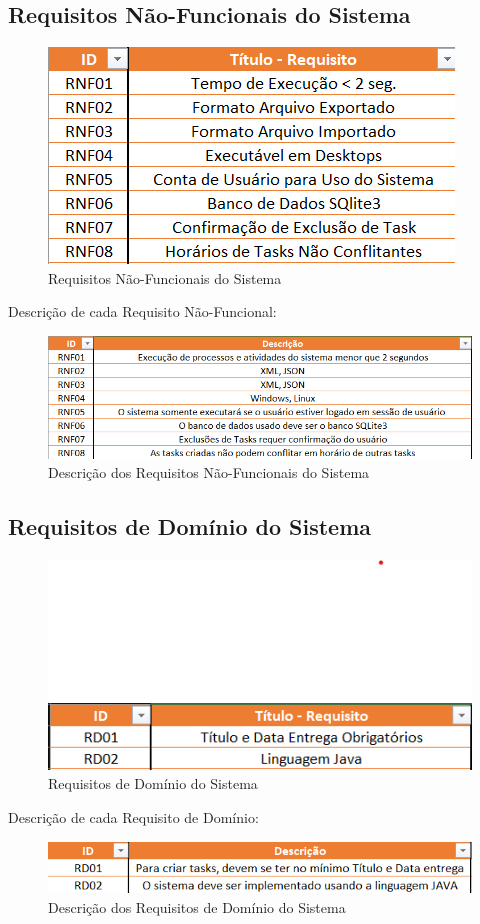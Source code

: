 \documentclass[a4paper,12pt]{article}
\begin{document}
\subsection{Requisitos Não-Funcionais do Sistema}
\begin{figure}[H]
	\centering
	\includegraphics[scale=0.80]{requirements/not-functionals/not-functionals.png}
	\caption{Requisitos Não-Funcionais do Sistema}
\end{figure}
Descrição de cada Requisito Não-Funcional:
\begin{figure}[H]
	\centering
	\includegraphics[scale=0.80]{requirements/not-functionals/description.png}
	\caption{Descrição dos Requisitos Não-Funcionais do Sistema}
\end{figure}

\subsection{Requisitos de Domínio do Sistema}
\begin{figure}[H]
	\centering
	\includegraphics[scale=0.80]{requirements/domain/domain.png}
	\caption{Requisitos de Domínio do Sistema}
\end{figure}
Descrição de cada Requisito de Domínio:
\begin{figure}[H]
	\centering
	\includegraphics[scale=0.80]{requirements/domain/description.png}
	\caption{Descrição dos Requisitos de Domínio do Sistema}
\end{figure}
\end{document}
